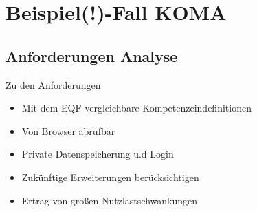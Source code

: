 \documentclass[
12pt,
english,
ngerman,
headsepline,
twoside,
openright,
numbers=noenddot,version=first
]{scrreprt}
\begin{document}







\chapter{Beispiel(!)-Fall KOMA}

\section{Anforderungen Analyse}

Zu den Anforderungen
\begin{itemize}
	\item Mit dem EQF vergleichbare Kompetenzeindefinitionen
	\item Von Browser abrufbar
	\item Private Datenspeicherung u.d Login
	\item Zukünftige Erweiterungen berücksichtigen
	\item Ertrag von großen Nutzlastschwankungen
\end{itemize}
\end{document}
